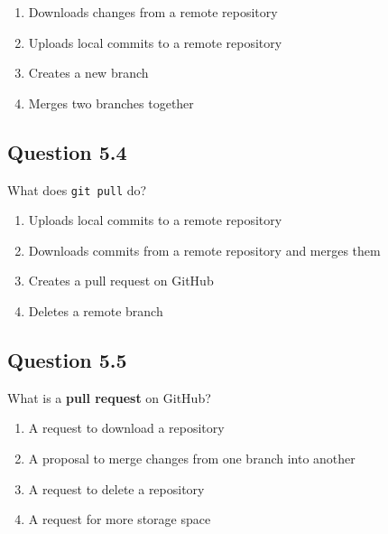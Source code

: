 \documentclass[
  letterpaper,
  DIV=11,
  numbers=noendperiod]{scrreprt}
\providecommand{\tightlist}{%
  \setlength{\itemsep}{0pt}\setlength{\parskip}{0pt}}
\begin{document}
\begin{enumerate}
\def\labelenumi{\Alph{enumi})}
\tightlist
\item
  Downloads changes from a remote repository\\
\item
  Uploads local commits to a remote repository\\
\item
  Creates a new branch\\
\item
  Merges two branches together
\end{enumerate}

\subsection{Question 5.4}\label{question-5.4}

What does \texttt{git\ pull} do?

\begin{enumerate}
\def\labelenumi{\Alph{enumi})}
\tightlist
\item
  Uploads local commits to a remote repository\\
\item
  Downloads commits from a remote repository and merges them\\
\item
  Creates a pull request on GitHub\\
\item
  Deletes a remote branch
\end{enumerate}

\subsection{Question 5.5}\label{question-5.5}

What is a \textbf{pull request} on GitHub?

\begin{enumerate}
\def\labelenumi{\Alph{enumi})}
\tightlist
\item
  A request to download a repository\\
\item
  A proposal to merge changes from one branch into another\\
\item
  A request to delete a repository\\
\item
  A request for more storage space
\end{enumerate}
\end{document}
